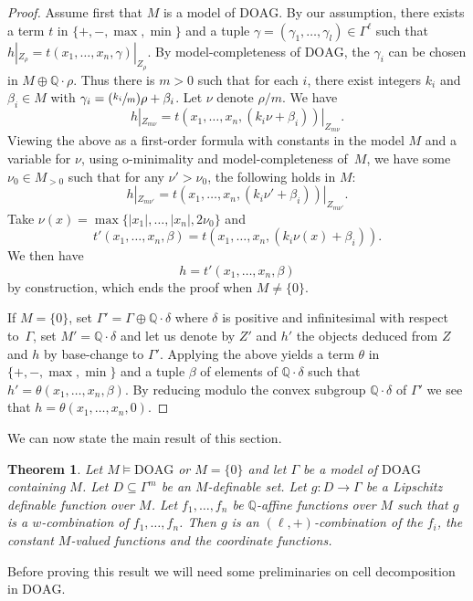 \documentclass[10pt]{amsart}
\newtheorem{theo}[subsection]{Theorem}
\theoremstyle{definition}
\theoremstyle{remark}
\newcommand{\Psfrac}[2]{(\sfrac{#1}{#2})}
\newcommand{\DOAG}{\mathrm{DOAG}}
\newcommand{\Q}{\mathbb Q}
\theoremstyle{plain}
\theoremstyle{definition}
\begin{document}
\begin{proof}
Assume first that $M$ is
a model of $\DOAG$. By our assumption,
there exists a term $t$ in $\{+,-,\max,\min\}$ and
a tuple
$\gamma=(\gamma_1,\ldots,\gamma_l)\in \Gamma^\ell$
such that $h|_{Z_\rho}=t(x_1,\ldots,x_n,\gamma)|_{Z_\rho}$.
By model-completeness of $\DOAG$, the $\gamma_i$ can be chosen in
$M\oplus \Q\cdot \rho$.
Thus there is $m>0$ such that for each $i$, there exist integers $k_i$ and $\beta_i\in M$
with $\gamma_i=\Psfrac{k_i}{m}\rho+\beta_i$. Let $\nu$ denote $\rho/m$.
We have
\[
h|_{Z_{m\nu}}=t(x_1,\ldots,x_n,(k_i\nu+\beta_i))|_{Z_{m\nu}}.
\]
Viewing the above as a first-order formula with constants in
the model $M$ and a variable for $\nu$, using o-minimality
and model-completeness of~$M$, we have some $\nu_0\in M_{>0}$ such that for any $\nu'>\nu_0$, the following holds in $M$:
\[
h|_{Z_{m\nu'}}=t(x_1,\ldots,x_n,(k_i\nu'+\beta_i))|_{Z_{m\nu'}}.
\]
Take $\nu(x)=\max \{|x_1|,\ldots,|x_n|,2\nu_0\}$ and
\[
t'(x_1,\ldots,x_n,\beta)=t(x_1,\ldots,x_n,(k_i\nu(x)+\beta_i)).
\]
We then have
\[
h=t'(x_1,\ldots,x_n,\beta)
\]
by construction, which ends the proof when $M\neq \{0\}$.

If $M=\{0\}$,
set $\Gamma'=\Gamma\oplus \Q\cdot \delta$ where $\delta$ is positive
and infinitesimal with respect to~$\Gamma$, set $M'=\Q\cdot \delta$ and
let us denote
by $Z'$ and $h'$ the objects
deduced from $Z$ and $h$ by base-change to $\Gamma'$.
Applying the above yields
a
term
$\theta$ in $\{+,-,\max,\min\}$
and a tuple $\beta$
of elements of $\Q\cdot \delta$ such that $h'=\theta(x_1,\ldots,x_n,\beta)$.
By reducing modulo the convex subgroup $\Q\cdot \delta$ of $\Gamma'$
we see that $h=\theta(x_1,\ldots,x_n,0)$.
\end{proof}

We can now state the main result of this section.

\begin{theo}\label{thm:lip-t-gen}
Let $M\models \DOAG$ or $M=\{0\}$ and
let $\Gamma$ be a model of
$\DOAG$ containing $M$.
Let $D\subseteq \Gamma^m$ be an $M$-definable set. Let $g:D\to \Gamma$ be a Lipschitz definable function over $M$. Let $f_1,\ldots,f_n$ be $\Q$-affine functions over $M$ such that $g$ is a $w$-combination of $f_1,\ldots,f_n$. Then $g$ is an $(\ell, +)$-combination of the $f_i$,
the constant $M$-valued functions and the coordinate functions.
\end{theo}

Before proving this result we will need some preliminaries on cell decomposition in $\DOAG$.
\end{document}

